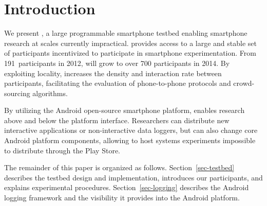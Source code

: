 \section{Introduction}
\label{sec-introduction}




We present \PhoneLab{}, a large programmable smartphone testbed enabling
smartphone research at scales currently impractical. \PhoneLab{} provides
access to a large and stable set of participants incentivized to participate
in smartphone experimentation. From 191~participants in 2012, \PhoneLab{}
will grow to over 700 participants in 2014. By exploiting locality,
\PhoneLab{} increases the density and interaction rate between participants,
facilitating the evaluation of phone-to-phone protocols and crowd-sourcing
algorithms.

By utilizing the Android open-source smartphone platform, \PhoneLab{} enables
research above and below the platform interface. Researchers can distribute
new interactive applications or non-interactive data loggers, but can also
change core Android platform components, allowing \PhoneLab{} to host systems
experiments impossible to distribute through the Play Store.

The remainder of this paper is organized as follows.
Section~\ref{sec-testbed} describes the testbed design and implementation,
introduces our participants, and explains experimental procedures.
Section~\ref{sec-logging} describes the Android logging framework and the
visibility it provides into the Android platform.


